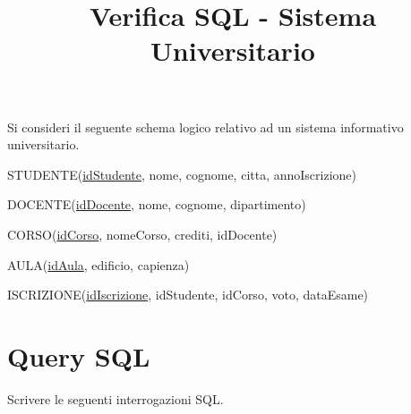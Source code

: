 \documentclass[a4paper,12pt]{article}
\title{Verifica SQL - Sistema Universitario}
\date{}
\begin{document}
\maketitle

Si consideri il seguente schema logico relativo ad un sistema informativo universitario.

STUDENTE(\underline{idStudente}, nome, cognome, citta, annoIscrizione)

DOCENTE(\underline{idDocente}, nome, cognome, dipartimento)

CORSO(\underline{idCorso}, nomeCorso, crediti, idDocente)

AULA(\underline{idAula}, edificio, capienza)

ISCRIZIONE(\underline{idIscrizione}, idStudente, idCorso, voto, dataEsame)

\section*{Query SQL}

Scrivere le seguenti interrogazioni SQL.
\end{document}
